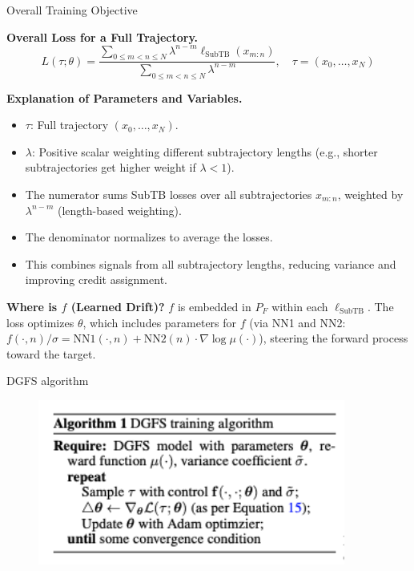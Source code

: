\documentclass[aspectratio=169,xcolor=dvipsnames]{beamer}
\begin{document}
\begin{frame}[t]{Overall Training Objective}
\scriptsize

\textbf{Overall Loss for a Full Trajectory.}
\[
L(\tau; \theta) = \frac{\sum_{0 \leq m < n \leq N} \lambda^{n-m} \ell_{\text{SubTB}}(x_{m:n})}{\sum_{0 \leq m < n \leq N} \lambda^{n-m}}, \quad \tau = (x_0, \dots, x_N)
\]

\textbf{Explanation of Parameters and Variables.}
\begin{itemize}\itemsep2pt
  \item $\tau$: Full trajectory $(x_0, \dots, x_N)$.
  \item $\lambda$: Positive scalar weighting different subtrajectory lengths (e.g., shorter subtrajectories get higher weight if $\lambda < 1$).
  \item The numerator sums SubTB losses over all subtrajectories $x_{m:n}$, weighted by $\lambda^{n-m}$ (length-based weighting).
  \item The denominator normalizes to average the losses.
  \item This combines signals from all subtrajectory lengths, reducing variance and improving credit assignment.
\end{itemize}

\textbf{Where is $f$ (Learned Drift)?} $f$ is embedded in $P_F$ within each $\ell_{\text{SubTB}}$. The loss optimizes $\theta$, which includes parameters for $f$ (via NN1 and NN2: $f(\cdot, n)/\sigma = \text{NN1}(\cdot, n) + \text{NN2}(n) \cdot \nabla \log \mu(\cdot)$), steering the forward process toward the target.
\end{frame}

\begin{frame}[t]{DGFS algorithm}

    \begin{figure}
        \centering
        \includegraphics[width=0.9\textwidth]{figures/algo.png}
    \end{figure}

\end{frame}
\end{document}

